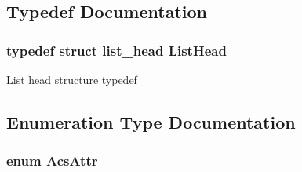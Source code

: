 \subsection{Typedef Documentation}
\hypertarget{group__LIBHELP_ga73f73d414f252ff46652f16495641187}{
\subsubsection[{List\-Head}]{\setlength{\rightskip}{0pt plus 5cm}typedef struct list\-\_\-head {\bf List\-Head}}}\label{group__LIBHELP_ga73f73d414f252ff46652f16495641187}
List head structure typedef 

\subsection{Enumeration Type Documentation}
\hypertarget{group__LIBHELP_ga394c61369f4e995f18b58c77d1a3cccb}{
\subsubsection[{Acs\-Attr}]{\setlength{\rightskip}{0pt plus 5cm}enum {\bf Acs\-Attr}}}\label{group__LIBHELP_ga394c61369f4e995f18b58c77d1a3cccb}
